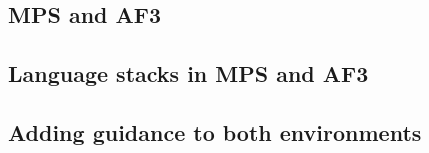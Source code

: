 \subsection{MPS and AF3}
\label{sec:mps}


\subsection{Language stacks in MPS and AF3}

\subsection{Adding guidance to both environments}
